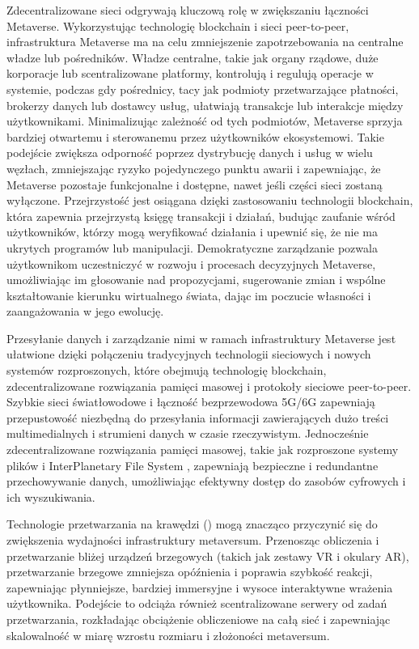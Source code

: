 Zdecentralizowane sieci odgrywają kluczową rolę w zwiększaniu łączności Metaverse. Wykorzystując technologię blockchain i sieci peer-to-peer, infrastruktura Metaverse ma na celu zmniejszenie zapotrzebowania na centralne władze lub pośredników. Władze centralne, takie jak organy rządowe, duże korporacje lub scentralizowane platformy, kontrolują i regulują operacje w systemie, podczas gdy pośrednicy, tacy jak podmioty przetwarzające płatności, brokerzy danych lub dostawcy usług, ułatwiają transakcje lub interakcje między użytkownikami. Minimalizując zależność od tych podmiotów, Metaverse sprzyja bardziej otwartemu i sterowanemu przez użytkowników ekosystemowi. Takie podejście zwiększa odporność poprzez dystrybucję danych i usług w wielu węzłach, zmniejszając ryzyko pojedynczego punktu awarii i zapewniając, że Metaverse pozostaje funkcjonalne i dostępne, nawet jeśli części sieci zostaną wyłączone. Przejrzystość jest osiągana dzięki zastosowaniu technologii blockchain, która zapewnia przejrzystą księgę transakcji i działań, budując zaufanie wśród użytkowników, którzy mogą weryfikować działania i upewnić się, że nie ma ukrytych programów lub manipulacji. Demokratyczne zarządzanie pozwala użytkownikom uczestniczyć w rozwoju i procesach decyzyjnych Metaverse, umożliwiając im głosowanie nad propozycjami, sugerowanie zmian i wspólne kształtowanie kierunku wirtualnego świata, dając im poczucie własności i zaangażowania w jego ewolucję\cite{metaverseInfrastructureIEEE}.

Przesyłanie danych i zarządzanie nimi w ramach infrastruktury Metaverse jest ułatwione dzięki połączeniu tradycyjnych technologii sieciowych i nowych systemów rozproszonych, które obejmują technologię blockchain, zdecentralizowane rozwiązania pamięci masowej i protokoły sieciowe peer-to-peer. Szybkie sieci światłowodowe i łączność bezprzewodowa 5G/6G zapewniają przepustowość niezbędną do przesyłania informacji zawierających dużo treści multimedialnych i strumieni danych w czasie rzeczywistym. Jednocześnie zdecentralizowane rozwiązania pamięci masowej, takie jak rozproszone systemy plików i InterPlanetary File System , zapewniają bezpieczne i redundantne przechowywanie danych, umożliwiając efektywny dostęp do zasobów cyfrowych i ich wyszukiwania\cite{metaverseInfrastructureIEEE}.

Technologie przetwarzania na krawędzi () mogą znacząco przyczynić się do zwiększenia wydajności infrastruktury metaversum. Przenosząc obliczenia i przetwarzanie bliżej urządzeń brzegowych (takich jak zestawy VR i okulary AR), przetwarzanie brzegowe zmniejsza opóźnienia i poprawia szybkość reakcji, zapewniając płynniejsze, bardziej immersyjne i wysoce interaktywne wrażenia użytkownika. Podejście to odciąża również scentralizowane serwery od zadań przetwarzania, rozkładając obciążenie obliczeniowe na całą sieć i zapewniając skalowalność w miarę wzrostu rozmiaru i złożoności metaversum\cite{metaverseInfrastructureIEEE}.

